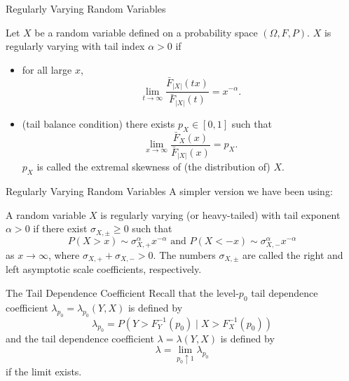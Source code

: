 \documentclass{beamer}
\begin{document}
\begin{frame}{Regularly Varying Random Variables}
    \begin{definition}
        Let $X$ be a random variable defined on a probability space $(\Omega, F, P)$. $X$ is regularly varying with tail index $\alpha > 0$ if
        \begin{itemize}
            \item for all large $x$,
            \[
            \lim_{t \to \infty} \frac{\bar{F}_{|X|}(t x)}{\bar{F}_{|X|}(t)} = x^{-\alpha}.
            \]
            \item (tail balance condition) there exists $p_X \in [0, 1]$ such that
            \[
            \lim_{x \to \infty} \frac{\bar{F}_X(x)}{\bar{F}_{|X|}(x)} = p_X.
            \]
            $p_X$ is called the extremal skewness of (the distribution of) $X$.
        \end{itemize}
    \end{definition}
\end{frame}

\begin{frame}{Regularly Varying Random Variables}
    A simpler version we have been using:
    \begin{definition}
        A random variable $X$ is regularly varying (or heavy-tailed) with tail exponent $\alpha > 0$ if there exist $\sigma_{X, \pm} \ge 0$ such that
        \begin{equation*}\label{eq:tail_conds}
            P(X > x) \sim \sigma_{X, +}^{\alpha}x^{-\alpha} \text{ and } P(X < -x) \sim \sigma_{X, -}^{\alpha}x^{-\alpha}
        \end{equation*}
        as $x \to \infty$, where $\sigma_{X, +} + \sigma_{X, -} > 0$. The numbers $\sigma_{X, \pm}$ are called the right and left asymptotic scale coefficients, respectively.
    \end{definition}
\end{frame}

\begin{frame}{The Tail Dependence Coefficient}
    Recall that the level-$p_0$ tail dependence coefficient $\lambda_{p_0} = \lambda_{p_0}(Y, X)$ is defined by
    \[
    \lambda_{p_0} = P(Y > F_Y^{-1}(p_0) \mid X > F_X^{-1}(p_0))
    \]
    and the tail dependence coefficient $\lambda = \lambda(Y, X)$ is defined by
    \[
    \lambda = \lim_{p_0 \uparrow 1} \lambda_{p_0}
    \]
    if the limit exists.
\end{frame}
\end{document}
